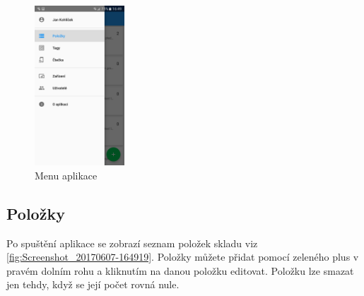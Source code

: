 \documentclass[czech,BP]{thesiskiv}
\begin{document}
\begin{figure}[h]
	\centering
	\includegraphics[width=0.3\textwidth]{../images/client_android/Screenshot_20170607-164924.png}	
	\caption{Menu aplikace}
	\label{fig:Screenshot_20170607-164924}
\end{figure}

\subsection{Položky}	

Po spuštění aplikace se zobrazí seznam položek skladu viz \ref{fig:Screenshot_20170607-164919}.
Položky můžete přidat pomocí zeleného plus v pravém dolním rohu a kliknutím na danou položku editovat.
Položku lze smazat jen tehdy, když se její počet rovná nule.
\end{document}
